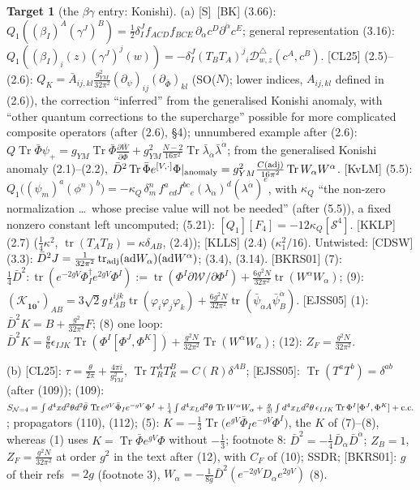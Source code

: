 \documentclass[11pt]{article}
\theoremstyle{definition}
\newtheorem{target}{Target}
\newcommand{\Tr}{\operatorname{Tr}}
\newcommand{\tr}{\operatorname{tr}}
\newcommand{\Sl}{\textup{[S]}}
\begin{document}
\begin{target}[the $\beta\gamma$ entry: Konishi]\label{t:konishi}
(a) \Sl\ [BK] (3.66): $Q_1((\beta_I)^A(\gamma^J)^B)=\tfrac12\delta^J_If_{ACD}f_{BCE}\,\partial_{\dot\alpha}c^D\partial^{\dot\alpha}c^E$; general representation (3.16): $Q_1((\beta_I)_i(z)(\gamma^J)^j(w))=-\delta^J_I(T_BT_A)^j{}_i\mathcal D^\triangle_{w,z}(c^A,c^B)$. [CL25] (2.5)--(2.6): $Q_K=\bar A_{ij,kl}\frac{g_{YM}^2}{32\pi^2}(\partial_\psi)_{ij}(\partial_{\bar\Phi})_{kl}$ (SO($N$); lower indices, $A_{ij,kl}$ defined in (2.6)), the correction ``inferred'' from the generalised Konishi anomaly, with ``other quantum corrections to the supercharge'' possible for more complicated composite operators (after (2.6), \S4); unnumbered example after (2.6): $Q\Tr\bar\Phi\psi_+=g_{YM}\Tr\bar\Phi\frac{\partial\bar W}{\partial\bar\Phi}+g_{YM}^2\frac{N-2}{16\pi^2}\Tr\bar\lambda_{\dot\alpha}\bar\lambda^{\dot\alpha}$; from the generalised Konishi anomaly (2.1)--(2.2), $\bar D^2\Tr\bar\Phi e^{[V,\cdot]}\Phi|_{\rm anomaly}=g_{YM}^2\frac{C({\rm adj})}{16\pi^2}\Tr W_\alpha W^\alpha$. [KvLM] (5.5): $Q_1\big((\psi_m)^a(\phi^n)^b\big)=-\kappa_Q\,\delta^n_m\,f^a{}_{cd}f^{bc}{}_e(\lambda_{\dot\alpha})^d(\lambda^{\dot\alpha})^e$, with $\kappa_Q$ ``the non-zero normalization \dots\ whose precise value will not be needed'' (after (5.5)), a fixed nonzero constant left uncomputed; (5.21): $[Q_1][F_4]=-12\kappa_Q[\mathcal S^4]$. [KKLP] (2.7) ($\frac14\kappa^2$, $\tr(T_AT_B)=\kappa\delta_{AB}$, (2.4)); [KLLS] (2.4) ($\kappa_1^2/16$). Untwisted: [CDSW] (3.3): $\bar D^2J=\frac1{32\pi^2}\tr_{\rm adj}(\mathrm{ad}W_\alpha)(\mathrm{ad}W^\alpha)$; (3.4), (3.14). [BKRS01] (7): $\frac14\bar D^2:\tr(e^{-2gV}\Phi^\dagger_Ie^{2gV}\Phi^I):=\tr(\Phi^I\partial\mathcal W/\partial\Phi^I)+\frac{6g^2N}{32\pi^2}\tr(W^\alpha W_\alpha)$; (9): $(\mathcal K_{\mathbf{10}^*})_{AB}=3\sqrt2g\,t^{ijk}_{AB}\tr(\varphi_i\varphi_j\varphi_k)+\frac{6g^2N}{32\pi^2}\tr(\bar\psi_{\dot\alpha A}\bar\psi^{\dot\alpha}_B)$. [EJSS05] (1): $\bar D^2K=B+\frac{g^2}{32\pi^2}F$; (8) one loop: $\bar D^2K=\frac g6\epsilon_{IJK}\Tr(\Phi^I[\Phi^J,\Phi^K])+\frac{g^2N}{32\pi^2}\Tr(W^\alpha W_\alpha)$; (12): $Z_F=\frac{g^2N}{32\pi^2}$.

(b) [CL25]: $\tau=\frac\theta{2\pi}+\frac{4\pi i}{g_{YM}^2}$, $\Tr T_R^AT_R^B=C(R)\delta^{AB}$; [EJSS05]: $\Tr(T^aT^b)=\delta^{ab}$ (after (109)); (109): $S_{\mathcal N=4}=\int d^4xd^2\theta d^2\bar\theta\,\Tr e^{gV}\bar\Phi_Ie^{-gV}\Phi^I+\frac14\int d^4x_Ld^2\theta\,\Tr W^\alpha W_\alpha+\frac g{3!}\int d^4x_Ld^2\theta\,\epsilon_{IJK}\Tr\Phi^I[\Phi^J,\Phi^K]+{\rm c.c.}$; propagators (110), (112); (5): $K=-\frac13\Tr\big(e^{gV}\bar\Phi_Ie^{-gV}\Phi^I\big)$, the $K$ of (7)--(8), whereas (1) uses $K=\Tr\bar\Phi e^{gV}\Phi$ without $-\frac13$; footnote 8: $\bar D^2=-\frac14\bar D_{\dot\alpha}\bar D^{\dot\alpha}$; $Z_B=1$, $Z_F=\frac{g^2N}{32\pi^2}$ at order $g^2$ in the text after (12), with $C_F$ of (10); SSDR; [BKRS01]: $g$ of their refs $=2g$ (footnote 3), $W_\alpha=-\frac1{8g}\bar D^2(e^{-2gV}D_\alpha e^{2gV})$ (8).


\end{target}
\end{document}
